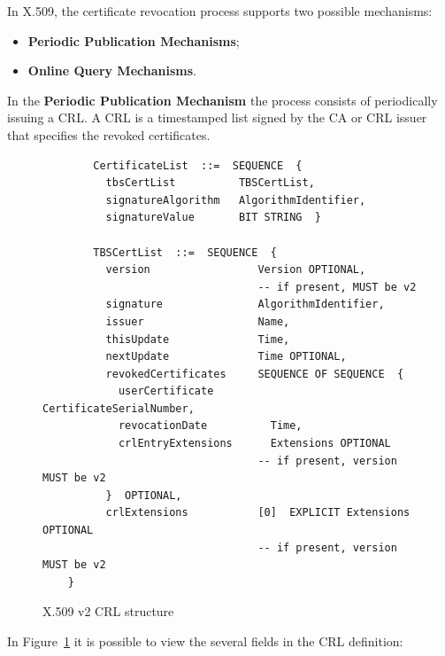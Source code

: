 In X.509, the certificate revocation process supports two possible mechanisms:

\begin{itemize}
	\item \textbf{Periodic Publication Mechanisms};
	\item \textbf{Online Query Mechanisms}.
\end{itemize}

In the \textbf{Periodic Publication Mechanism} the process consists of periodically issuing a \acl{CRL}. A \ac{CRL} is a timestamped list signed by the \ac{CA} or \ac{CRL} issuer that specifies the revoked certificates.

\begin{figure}
	\begin{verbatim}
		CertificateList  ::=  SEQUENCE  {
		  tbsCertList          TBSCertList,
		  signatureAlgorithm   AlgorithmIdentifier,
		  signatureValue       BIT STRING  }

		TBSCertList  ::=  SEQUENCE  {
		  version                 Version OPTIONAL,
		                          -- if present, MUST be v2
		  signature               AlgorithmIdentifier,
		  issuer                  Name,
		  thisUpdate              Time,
		  nextUpdate              Time OPTIONAL,
		  revokedCertificates     SEQUENCE OF SEQUENCE  {
		    userCertificate         CertificateSerialNumber,
		    revocationDate          Time,
		    crlEntryExtensions      Extensions OPTIONAL
		                          -- if present, version MUST be v2
		  }  OPTIONAL,
		  crlExtensions           [0]  EXPLICIT Extensions OPTIONAL
		                          -- if present, version MUST be v2
	}
	\end{verbatim}
    \caption{X.509 v2 CRL structure}
    \label{fig:x509-crl}
\end{figure}

In Figure~\ref{fig:x509-crl} it is possible to view the several fields in the \ac{CRL} definition:

